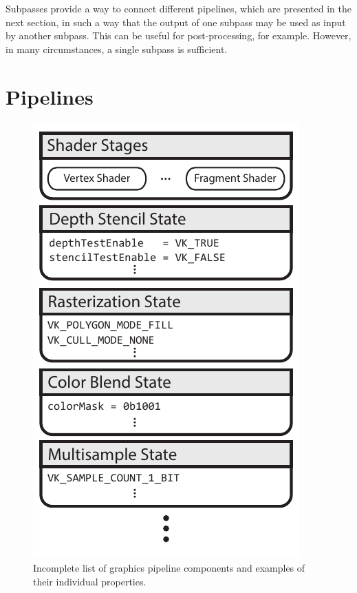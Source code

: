     Subpasses provide a way to connect different pipelines, which are presented in the next section, in such a way that the output of one subpass may be used as input by another subpass.
    This can be useful for post-processing, for example.
    However, in many circumstances, a single subpass is sufficient.

  \section{Pipelines}
  \label{sec:Pipelines}


    \begin{figure}
      \centering
      \includegraphics[height=0.4\textheight]{Main/Images/GraphicsPipeline}
      \caption{Incomplete list of graphics pipeline components and examples of their individual properties.}
      \label{fig:GraphicsPipeline}
    \end{figure}


